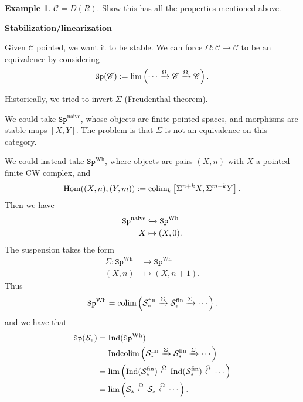 \documentclass[12pt]{amsart}
\theoremstyle{definition}
\newtheorem{example}[theorem]{Example}
\providecommand{\Sp}{\texttt{Sp}}
\providecommand{\Sp}{\text{Sp}}
\begin{document}
\begin{example} $\mathscr{C} = D(R)$. Show this has all the properties mentioned above.
\end{example}

\begin{center}
    \textbf{Stabilization/linearization}
\end{center}

Given $\mathscr{C}$ pointed, we want it to be stable. We can force $\Omega : \mathscr{C} \to \mathscr{C}$ to be an equivalence by considering
\begin{align*}
    \Sp(\mathscr{C}) := \lim \left( \cdots \xto{\Omega} \mathscr{C} \xto{\Omega} \mathscr{C} \right).
\end{align*}

Historically, we tried to invert $\Sigma$ (Freudenthal theorem).

We could take $\Sp^{\text{naive}}$, whose objects are finite pointed spaces, and morphisms are stable maps $[X,Y]$. The problem is that $\Sigma$ is not an equivalence on this category.

We could instead take $\Sp^{\text{Wh}}$, where objects are pairs $(X,n)$ with $X$ a pointed finite CW complex, and
\begin{align*}
    \text{Hom}((X,n),(Y,m)) := \text{colim}_k \left[ \Sigma^{n+k} X, \Sigma^{m+k} Y \right].
\end{align*}
Then we have
\begin{align*}
    \Sp^\text{naive} &\hookto \Sp^\text{Wh} \\
    X &\mapsto (X,0).
\end{align*}
The suspension takes the form
\begin{align*}
    \Sigma: \Sp^\text{Wh} &\to \Sp^\text{Wh} \\
    (X,n) &\mapsto (X,n+1).
\end{align*}
Thus
\begin{align*}
    \Sp^\text{Wh} = \colim \left( \mathcal{S}_\ast^\text{fin} \xto{\Sigma} \mathcal{S}_\ast^\text{fin} \xto{\Sigma}  \cdots \right).
\end{align*}
and we have that
\begin{align*}
    \Sp(\mathcal{S}_\ast) &= \Ind(\Sp^\text{Wh}) \\
    &= \Ind \colim \left( \mathcal{S}_\ast^\text{fin} \xto{\Sigma} \mathcal{S}_\ast^\text{fin} \xto{\Sigma}  \cdots \right) \\
    &= \lim \left( \Ind(\mathcal{S}_\ast^\text{fin}) \xfrom{\Omega} \Ind(\mathcal{S}_\ast^\text{fin}) \xfrom{\Omega} \cdots \right) \\
    &= \lim \left( \mathcal{S}_\ast \xfrom{\Omega} \mathcal{S}_\ast \xfrom{\Omega} \cdots \right).
\end{align*}
\end{document}
